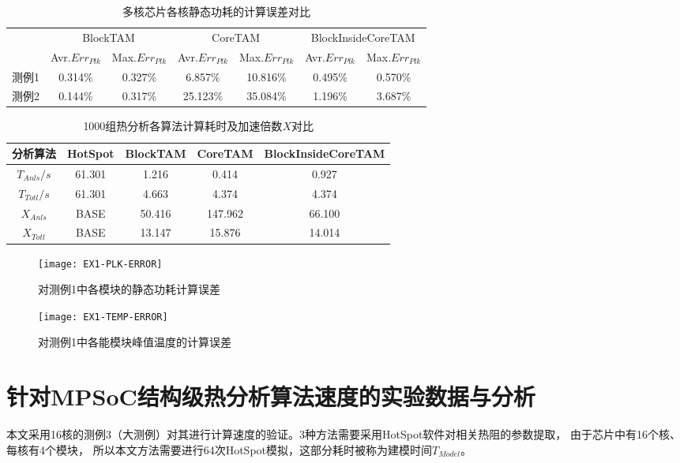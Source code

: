 \begin{table}
\centering
\caption{多核芯片各核静态功耗的计算误差对比}
\begin{tabular}{c c c c c c c}
\hline\hline
 & \multicolumn{2}{c}{BlockTAM} & \multicolumn{2}{c}{CoreTAM} & \multicolumn{2}{c}{BlockInsideCoreTAM} \\
 & Avr.$Err_{Plk}$ & Max.$Err_{Plk}$ & Avr.$Err_{Plk}$ & Max.$Err_{Plk}$ & Avr.$Err_{Plk}$ & Max.$Err_{Plk}$ \\
\hline
测例1 & 0.314\% & 0.327\% & 6.857\% & 10.816\% & 0.495\% & 0.570\% \\
\hline
测例2 & 0.144\% & 0.317\% & 25.123\% & 35.084\% & 1.196\% & 3.687\% \\
\hline
\end{tabular}
\label{tab:chap5:power-leakage-error}
\end{table}

\begin{table}
\centering
\caption{1000组热分析各算法计算耗时及加速倍数$X$对比}
\begin{tabular}{c c c c c}
\hline\hline
分析算法 & HotSpot & BlockTAM & CoreTAM & BlockInsideCoreTAM \\ [0.5ex]
\hline
$T_{Anls}/s$ & 61.301 & 1.216 & 0.414 & 0.927 \\
\hline
$T_{Totl}/s$ & 61.301 & 4.663 & 4.374 & 4.374 \\
\hline
$X_{Anls}$ & BASE & 50.416 & 147.962 & 66.100 \\
\hline
$X_{Totl}$ & BASE & 13.147 & 15.876 & 14.014 \\
\hline
\end{tabular}
\label{tab:chap5:time-speedup}
\end{table}

\begin{figure}[H]
  \centering
  \texttt{[image: EX1-PLK-ERROR]}
  \caption{对测例1中各模块的静态功耗计算误差}
  \label{fig:ex1-plk-error}
\end{figure}
\begin{figure}[H]
  \centering
  \texttt{[image: EX1-TEMP-ERROR]}
  \caption{对测例1中各能模块峰值温度的计算误差}
  \label{fig:ex1-temp-error}
\end{figure}


\section{针对MPSoC结构级热分析算法速度的实验数据与分析}
\label{exp-speedup}
本文采用16核的测例3（大测例）对其进行计算速度的验证。3种方法需要采用HotSpot软件对相关热阻的参数提取， 由于芯片中有16个核、每核有4个模块， 所以本文方法需要进行64次HotSpot模拟，这部分耗时被称为建模时间$T_{Model}$。


